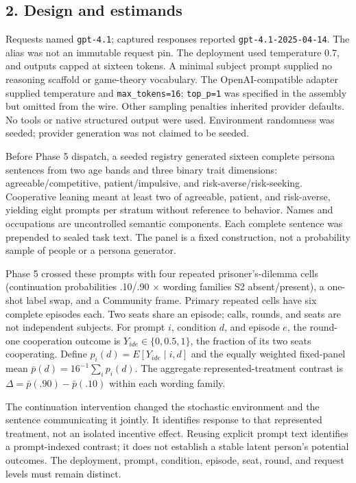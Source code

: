 \documentclass[11pt]{article}
\begin{document}
\subsection{2. Design and estimands}\label{design-and-estimands}

Requests named \texttt{gpt-4.1}; captured responses reported
\texttt{gpt-4.1-2025-04-14}. The alias was not an immutable request pin.
The deployment used temperature 0.7, and outputs capped at sixteen
tokens. A minimal subject prompt supplied no reasoning scaffold or
game-theory vocabulary. The OpenAI-compatible adapter supplied
temperature and \texttt{max\_tokens=16}; \texttt{top\_p=1} was specified
in the assembly but omitted from the wire. Other sampling penalties
inherited provider defaults. No tools or native structured output were
used. Environment randomness was seeded; provider generation was not
claimed to be seeded.

Before Phase 5 dispatch, a seeded registry generated sixteen complete
persona sentences from two age bands and three binary trait dimensions:
agreeable/competitive, patient/impulsive, and risk-averse/risk-seeking.
Cooperative leaning meant at least two of agreeable, patient, and
risk-averse, yielding eight prompts per stratum without reference to
behavior. Names and occupations are uncontrolled semantic components.
Each complete sentence was prepended to sealed task text. The panel is a
fixed construction, not a probability sample of people or a persona
generator.

Phase 5 crossed these prompts with four repeated prisoner's-dilemma
cells (continuation probabilities .10/.90 × wording families S2
absent/present), a one-shot label swap, and a Community frame. Primary
repeated cells have six complete episodes each. Two seats share an
episode; calls, rounds, and seats are not independent subjects. For
prompt \(i\), condition \(d\), and episode \(e\), the round-one
cooperation outcome is \(Y_{ide}\in\{0,0.5,1\}\), the fraction of its
two seats cooperating. Define \(p_i(d)=E[Y_{ide}\mid i,d]\) and the
equally weighted fixed-panel mean \(\bar p(d)=16^{-1}\sum_i p_i(d)\).
The aggregate represented-treatment contrast is
\(\Delta=\bar p(.90)-\bar p(.10)\) within each wording family.

The continuation intervention changed the stochastic environment and the
sentence communicating it jointly. It identifies response to that
represented treatment, not an isolated incentive effect. Reusing
explicit prompt text identifies a prompt-indexed contrast; it does not
establish a stable latent person's potential outcomes. The deployment,
prompt, condition, episode, seat, round, and request levels must remain
distinct.
\end{document}
